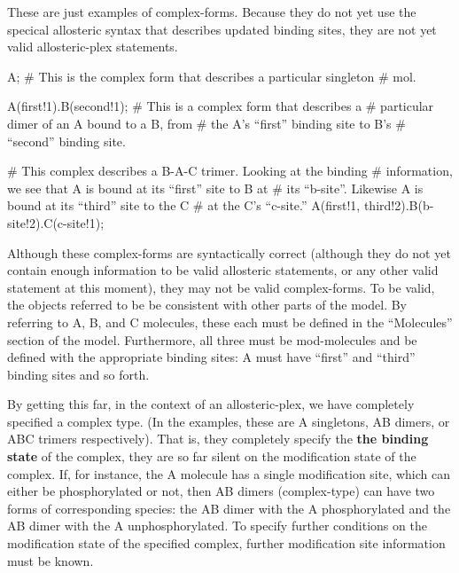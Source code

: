 These are just examples of complex-forms.  Because they do not yet use
the specical allosteric syntax that describes updated binding sites,
they are not yet valid allosteric-plex statements.

\begin{ExampleMZR}

A;  # This is the complex form that describes a particular singleton
    # mol.

A(first!1).B(second!1); # This is a complex form that describes a
                        # particular dimer of an A bound to a B, from
                        # the A's ``first'' binding site to B's
                        # ``second'' binding site.

# This complex describes a B-A-C trimer.  Looking at the binding
# information, we see that A is bound at its ``first'' site to B at 
# its ``b-site''.  Likewise A is bound at its ``third'' site to the C 
# at the C's ``c-site.''
A(first!1, third!2).B(b-site!2).C(c-site!1);

\end{ExampleMZR}


Although these complex-forms are syntactically correct (although they
do not yet contain enough information to be valid allosteric
statements, or any other valid statement at this moment), they may not
be valid complex-forms.  To be valid, the objects referred to be be
consistent with other parts of the model.  By referring to A, B, and C
molecules, these each must be defined in the ``Molecules'' section of the
model.  Furthermore, all three must be mod-molecules and be defined with
the appropriate binding sites: A must have ``first'' and ``third''
binding sites and so forth.  

By getting this far, in the context of an allosteric-plex, we have
completely specified a complex type.  (In the examples, these are A
singletons, AB dimers, or ABC trimers respectively).  That is, they
completely specify the {\bf the binding state} of the complex, they
are so far silent on the modification state of the complex.  If, for
instance, the A molecule has a single modification site, which can
either be phosphorylated or not, then AB dimers (complex-type) can
have two forms of corresponding species: the AB dimer with the A
phosphorylated and the AB dimer with the A unphosphorylated.  To
specify further conditions on the modification state of the specified
complex, further modification site information must be known.  

